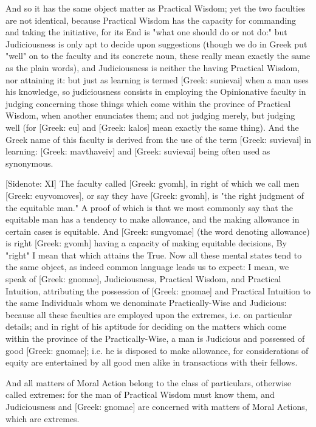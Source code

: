 And so it has the same object matter as Practical Wisdom; yet the two
faculties are not identical, because Practical Wisdom has the capacity
for commanding and taking the initiative, for its End is "what one
should do or not do:" but Judiciousness is only apt to decide upon
suggestions (though we do in Greek put "well" on to the faculty and its
concrete noun, these really mean exactly the same as the plain words),
and Judiciousness is neither the having Practical Wisdom, nor attaining
it: but just as learning is termed [Greek: sunievai] when a man uses
his knowledge, so judiciousness consists in employing the Opinionative
faculty in judging concerning those things which come within the
province of Practical Wisdom, when another enunciates them; and not
judging merely, but judging well (for [Greek: eu] and [Greek: kalos]
mean exactly the same thing). And the Greek name of this faculty is
derived from the use of the term [Greek: suvievai] in learning: [Greek:
mavthaveiv] and [Greek: suvievai] being often used as synonymous.

[Sidenote: XI] The faculty called [Greek: gvomh], in right of which we
call men [Greek: euyvomoves], or say they have [Greek: gvomh], is "the
right judgment of the equitable man." A proof of which is that we most
commonly say that the equitable man has a tendency to make allowance,
and the making allowance in certain cases is equitable. And [Greek:
sungvomae] (the word denoting allowance) is right [Greek: gvomh] having
a capacity of making equitable decisions, By "right" I mean that which
attains the True. Now all these mental states tend to the same object,
as indeed common language leads us to expect: I mean, we speak of
[Greek: gnomae], Judiciousness, Practical Wisdom, and Practical
Intuition, attributing the possession of [Greek: gnomae] and Practical
Intuition to the same Individuals whom we denominate Practically-Wise
and Judicious: because all these faculties are employed upon the
extremes, i.e. on particular details; and in right of his aptitude
for deciding on the matters which come within the province of the
Practically-Wise, a man is Judicious and possessed of good [Greek:
gnomae]; i.e. he is disposed to make allowance, for considerations of
equity are entertained by all good men alike in transactions with their
fellows.

And all matters of Moral Action belong to the class of particulars,
otherwise called extremes: for the man of Practical Wisdom must know
them, and Judiciousness and [Greek: gnomae] are concerned with matters
of Moral Actions, which are extremes.

